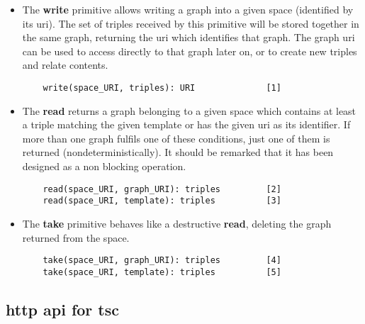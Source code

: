 \begin{itemize}
 \item The \textbf{write} primitive allows writing a graph into a given space (identified by its \acs{uri}).
	The set of triples received by this primitive will be stored together in the same graph, returning the \acs{uri} which identifies that graph.
	The graph \acs{uri} can be used to access directly to that graph later on, or to create new triples and relate contents.
  \begin{lstlisting}
    write(space_URI, triples): URI              [1]
  \end{lstlisting}


  \item The \textbf{read} returns a graph belonging to a given space which contains at least a triple matching the given template or has the given \acs{uri} as its identifier.
	If more than one graph fulfils one of these conditions, just one of them is returned (nondeterministically).
	It should be remarked that it has been designed as a non blocking operation.
  \begin{lstlisting}
    read(space_URI, graph_URI): triples         [2]
    read(space_URI, template): triples          [3]
  \end{lstlisting}
  
  
  \item The \textbf{take} primitive behaves like a destructive \textbf{read}, deleting the graph returned from the space.
  \begin{lstlisting}
    take(space_URI, graph_URI): triples         [4]
    take(space_URI, template): triples          [5]
  \end{lstlisting}

\end{itemize}



\subsection{\acs{http} \acs{api} for \acs{tsc}}
\label{sec:httpapi}

